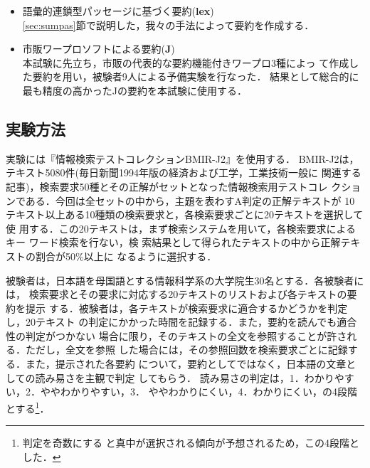 \begin{itemize}
\begin{enumerate}
これまでの語彙的連鎖を用いた要約作成手法の多くは，
このような，連鎖を用いた重要文抽出と言うことができる
\cite{Barzilay:97,sanfilippo:98:a}．

	\item 検索要求を考慮する場合({\bf q-cf.idf})\\
	検索語を含む連鎖には重み$\alpha$をかける\footnote{{\bf q-tf.idf}の
	場合と同様に$\alpha=3$とした．}．
	\begin{equation}\label{qb_cfidf}
	w_{i} =
	\left\{
        \begin{array}{rl}
	\mid i\mid\times log\frac{N}{df_{i}} &\quad\mbox{検索語でない}\\
	\alpha\times \mid i\mid\times log\frac{N}{df_{i}} &\quad\mbox{検索語}\\
        \end{array}\right.
	\end{equation}
	\end{enumerate}

\item 語彙的連鎖型パッセージに基づく要約({\bf lex})\\
\ref{sec:sumpas}節で説明した，我々の手法によって要約を作成する．
\item 市販ワープロソフトによる要約({\bf J})\\
	本試験に先立ち，市販の代表的な要約機能付きワープロ3種によっ
	て作成した要約を用い，被験者9人による予備実験を行なった．
	結果として総合的に最も精度の高かったJの要約を本試験に使用する．
\end{itemize}


\subsection{実験方法}
実験には『情報検索テストコレクションBMIR-J2』\cite{BMIR-J2:98j}を使用する．
BMIR-J2は，テキスト5080件(毎日新聞1994年版の経済および工学，工業技術一般に
関連する記事)，検索要求50種とその正解がセットとなった情報検索用テストコレ
クションである．今回は全セットの中から，主題を表わすA判定の正解テキストが
10テキスト以上ある10種類の検索要求と，各検索要求ごとに20テキストを選択して使
用する．この20テキストは，まず検索システムを用いて，各検索要求によるキー
ワード検索を行ない，検
索結果として得られたテキストの中から正解テキストの割合が50\%以上に
なるように選択する．

被験者は，日本語を母国語とする情報科学系の大学院生30名とする．各被験者には，
検索要求とその要求に対応する20テキストのリストおよび各テキストの要約を提示
する．被験者は，各テキストが検索要求に適合するかどうかを判定し，20テキスト
の判定にかかった時間を記録する．また，要約を読んでも適合性の判定がつかない
場合に限り，そのテキストの全文を参照することが許される．ただし，全文を参照
した場合には，その参照回数を検索要求ごとに記録する．また，提示された各要約
について，要約としてではなく，日本語の文章としての読み易さを主観で判定
してもらう．
読み易さの判定は，1．わかりやすい，2．ややわかりやすい，3．
ややわかりにくい，4．わかりにくい，の4段階とする\footnote{判定を奇数にする
と真中が選択される傾向が予想されるため，この4段階とした．}．

